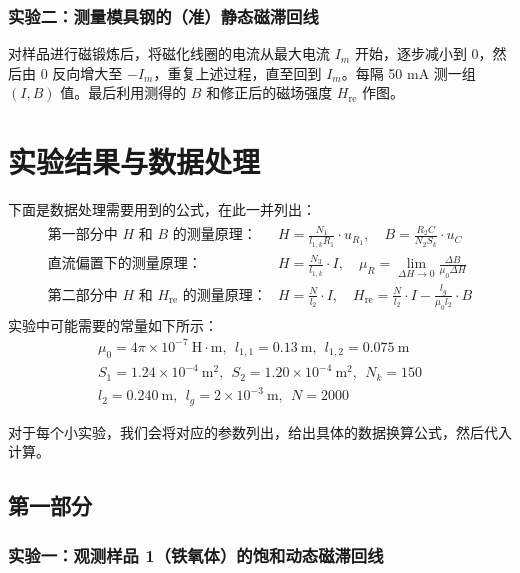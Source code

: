 \documentclass[UTF8]{article}
\theoremstyle{MyLineTheoremStyle} %
\theoremstyle{MyBlockTheoremStyle} %
\theoremstyle{MySubsubsectionStyle} %
\begin{document}
\subsubsection{实验二：测量模具钢的（准）静态磁滞回线}

对样品进行磁锻炼后，将磁化线圈的电流从最大电流 $I_m$ 开始，逐步减小到 0，然后由 0 反向增大至 $-I_m$，重复上述过程，直至回到 $I_m$。每隔 50 mA 测一组 $(I, B)$ 值。最后利用测得的 $B$ 和修正后的磁场强度 $H_{\text{re}}$ 作图。

\newpage
\section{实验结果与数据处理}

下面是数据处理需要用到的公式，在此一并列出：
\begin{align}
\boxed{
\begin{aligned}
    \text{第一部分中 $H$ 和 $B$ 的测量原理：}& H = \frac{N_1}{l_{1, k}R_1}\cdot u_{R_1},\quad B = \frac{R_2 C}{N_2 S_k}\cdot u_C
    \\
    \text{直流偏置下的测量原理：}&  H = \frac{N_3}{l_{1, k}}\cdot I,\quad \mu_R=\lim_{\Delta H\to 0}\frac{\Delta B}{\mu_0\Delta H}
    \\
    \text{第二部分中 $H$ 和 $H_{\text{re}}$ 的测量原理：}& H = \frac{N}{l_2}\cdot I,\quad H_{\text{re}} = \frac{N}{l_2}\cdot I - \frac{l_g}{\mu_0 l_2}\cdot B
\end{aligned}
}
\end{align}
实验中可能需要的常量如下所示：
\begin{gather}
    \mu_0 = 4\pi \times 10^{-7}\  \mathrm{H\cdot m},\ \ 
    l_{1, 1} = 0.13 \ \mathrm{m},\ \ 
    l_{1, 2} = 0.075 \ \mathrm{m}
    \\
    S_1 = 1.24 \times 10^{-4}\ \mathrm{m^2} ,\ \ 
    S_2 = 1.20 \times 10^{-4}\ \mathrm{m^2} ,\ \ 
    N_k = 150
    \\ 
    l_2 = 0.240 \ \mathrm{m},\ \ l_g = 2 \times 10^{-3} \ \mathrm{m},\ \ N = 2000
\end{gather}

对于每个小实验，我们会将对应的参数列出，给出具体的数据换算公式，然后代入计算。

\subsection{第一部分}
\subsubsection{实验一：观测样品 1（铁氧体）的饱和动态磁滞回线}\label{铁氧体}
\end{document}
